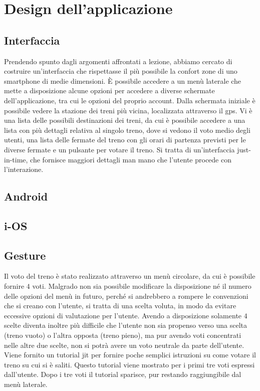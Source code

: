\chapter{Design dell'applicazione\label{sec:design}}

\section{Interfaccia\label{sec:interfaccia}}
Prendendo spunto dagli argomenti affrontati a lezione, abbiamo cercato di costruire un'interfaccia che rispettasse il più possibile la confort zone di uno smartphone di medie dimensioni.
È possibile accedere a un menù laterale che mette a disposizione alcune opzioni per accedere a diverse schermate dell'applicazione, tra cui le opzioni del proprio account.
Dalla schermata iniziale è possibile vedere la stazione dei treni più vicina, localizzata attraverso il gps.
Vi è una lista delle possibili destinazioni dei treni, da cui è possibile accedere a una lista con più dettagli relativa al singolo treno, dove si vedono il voto medio degli utenti, una lista delle fermate del treno con gli orari di partenza previsti per le diverse fermate e un pulsante per votare il treno.
Si tratta di un'interfaccia just-in-time, che fornisce maggiori dettagli man mano che l'utente procede con l'interazione.

\section{Android\label{sec:android}}

\section{i-OS\label{sec:i-os}}

\section{Gesture\label{sec:gesture}}
Il voto del treno è stato realizzato attraverso un menù circolare, da cui è possibile fornire $4$ voti.
Malgrado non sia possibile modificare la disposizione né il numero delle opzioni del menù in futuro, perché si andrebbero a rompere le convenzioni che si creano con l'utente, si tratta di una scelta voluta, in modo da evitare eccessive opzioni di valutazione per l'utente.
Avendo a disposizione solamente $4$ scelte diventa inoltre più difficile che l'utente non sia propenso verso una scelta (treno vuoto) o l'altra opposta (treno pieno), ma pur avendo voti concentrati nelle altre due scelte, non si potrà avere un voto neutrale da parte dell'utente.
Viene fornito un tutorial jit per fornire poche semplici istruzioni su come votare il treno su cui si è saliti.
Questo tutorial viene mostrato per i primi tre voti espressi dall'utente.
Dopo i tre voti il tutorial sparisce, pur restando raggiungibile dal menù laterale.